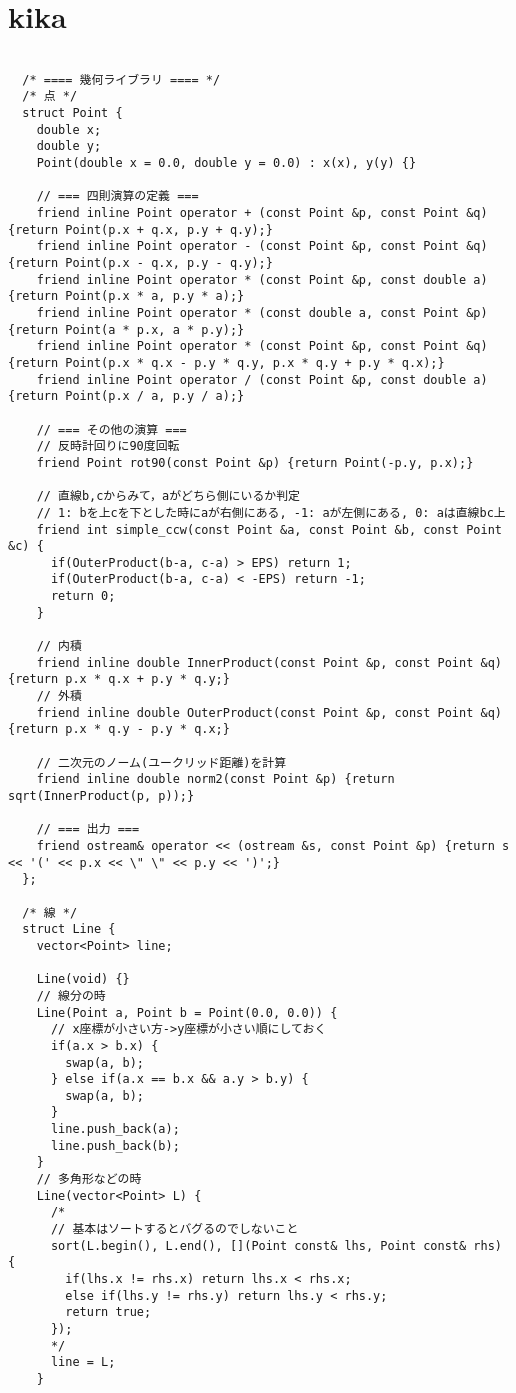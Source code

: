 \documentclass{jsarticle}
\begin{document}
\section{kika}
\color{black}
\begin{lstlisting}[caption=kika]

  /* ==== 幾何ライブラリ ==== */
  /* 点 */
  struct Point {
    double x;
    double y;
    Point(double x = 0.0, double y = 0.0) : x(x), y(y) {}
  
    // === 四則演算の定義 ===
    friend inline Point operator + (const Point &p, const Point &q) {return Point(p.x + q.x, p.y + q.y);}
    friend inline Point operator - (const Point &p, const Point &q) {return Point(p.x - q.x, p.y - q.y);}
    friend inline Point operator * (const Point &p, const double a) {return Point(p.x * a, p.y * a);}
    friend inline Point operator * (const double a, const Point &p) {return Point(a * p.x, a * p.y);}
    friend inline Point operator * (const Point &p, const Point &q) {return Point(p.x * q.x - p.y * q.y, p.x * q.y + p.y * q.x);}
    friend inline Point operator / (const Point &p, const double a) {return Point(p.x / a, p.y / a);}
  
    // === その他の演算 ===
    // 反時計回りに90度回転
    friend Point rot90(const Point &p) {return Point(-p.y, p.x);}
  
    // 直線b,cからみて，aがどちら側にいるか判定
    // 1: bを上cを下とした時にaが右側にある, -1: aが左側にある, 0: aは直線bc上
    friend int simple_ccw(const Point &a, const Point &b, const Point &c) {
      if(OuterProduct(b-a, c-a) > EPS) return 1;
      if(OuterProduct(b-a, c-a) < -EPS) return -1;
      return 0;
    }
  
    // 内積
    friend inline double InnerProduct(const Point &p, const Point &q) {return p.x * q.x + p.y * q.y;}
    // 外積
    friend inline double OuterProduct(const Point &p, const Point &q) {return p.x * q.y - p.y * q.x;}
  
    // 二次元のノーム(ユークリッド距離)を計算
    friend inline double norm2(const Point &p) {return sqrt(InnerProduct(p, p));}
  
    // === 出力 ===
    friend ostream& operator << (ostream &s, const Point &p) {return s << '(' << p.x << \" \" << p.y << ')';}
  };
  
  /* 線 */
  struct Line {
    vector<Point> line;
  
    Line(void) {}
    // 線分の時
    Line(Point a, Point b = Point(0.0, 0.0)) {
      // x座標が小さい方->y座標が小さい順にしておく
      if(a.x > b.x) {
        swap(a, b);
      } else if(a.x == b.x && a.y > b.y) {
        swap(a, b);
      }
      line.push_back(a);
      line.push_back(b);
    }
    // 多角形などの時
    Line(vector<Point> L) {
      /*
      // 基本はソートするとバグるのでしないこと
      sort(L.begin(), L.end(), [](Point const& lhs, Point const& rhs) {
        if(lhs.x != rhs.x) return lhs.x < rhs.x;
        else if(lhs.y != rhs.y) return lhs.y < rhs.y;
        return true;
      });
      */
      line = L;
    }
  

\end{lstlisting}
\end{document}
